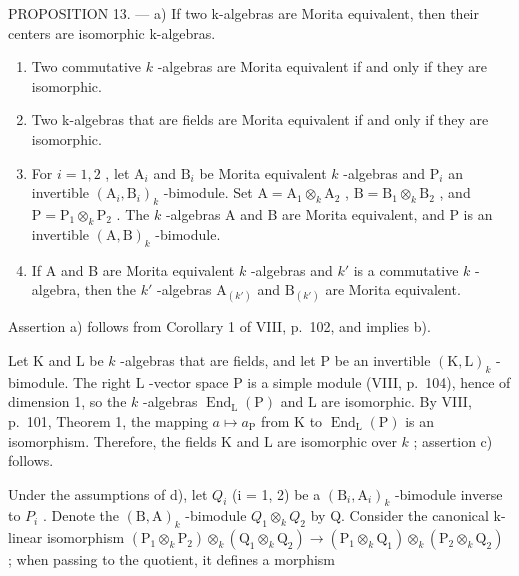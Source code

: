 PROPOSITION 13. --- a) If two k-algebras are Morita equivalent, then their centers are isomorphic k-algebras.

\begin{enumerate}
\def\labelenumi{\alph{enumi})}
\setcounter{enumi}{1}
\item
  Two commutative \(k\) -algebras are Morita equivalent if and only if they are isomorphic.
\item
  Two k-algebras that are fields are Morita equivalent if and only if they are isomorphic.
\item
  For \(i = 1,2\) , let \(\mathrm{A}_i\) and \(\mathrm{B}_i\) be Morita equivalent \(k\) -algebras and \(\mathrm{P}_i\) an invertible \((\mathrm{A}_i,\mathrm{B}_i)_k\) -bimodule. Set \(\mathrm{A} = \mathrm{A}_1\otimes_k\mathrm{A}_2\) , \(\mathrm{B} = \mathrm{B}_1\otimes_k\mathrm{B}_2\) , and \(\mathrm{P} = \mathrm{P}_1 \otimes_k \mathrm{P}_2\) . The \(k\) -algebras A and B are Morita equivalent, and P is an invertible \((\mathrm{A}, \mathrm{B})_k\) -bimodule.
\item
  If A and B are Morita equivalent \(k\) -algebras and \(k'\) is a commutative \(k\) -algebra, then the \(k'\) -algebras \(\mathrm{A}_{(k')}\) and \(\mathrm{B}_{(k')}\) are Morita equivalent.
\end{enumerate}

Assertion a) follows from Corollary 1 of VIII, p.~102, and implies b).

Let \(\mathrm{K}\) and \(\mathrm{L}\) be \(k\) -algebras that are fields, and let \(\mathrm{P}\) be an invertible \((\mathrm{K},\mathrm{L})_k\) -bimodule. The right \(\mathrm{L}\) -vector space \(\mathrm{P}\) is a simple module (VIII, p.~104), hence of dimension 1, so the \(k\) -algebras \(\operatorname{End}_{\mathrm{L}}(\mathrm{P})\) and \(\mathrm{L}\) are isomorphic. By VIII, p.~101, Theorem 1, the mapping \(a\mapsto a_{\mathrm{P}}\) from \(\mathrm{K}\) to \(\operatorname{End}_{\mathrm{L}}(\mathrm{P})\) is an isomorphism. Therefore, the fields \(\mathrm{K}\) and \(\mathrm{L}\) are isomorphic over \(k\) ; assertion c) follows.

Under the assumptions of d), let \(Q_{i}\) (i = 1, 2) be a \((\mathrm{B}_{i}, \mathrm{A}_{i})_{k}\) -bimodule inverse to \(P_{i}\) . Denote the \((\mathrm{B}, \mathrm{A})_{k}\) -bimodule \(Q_{1} \otimes_{k} Q_{2}\) by Q. Consider the canonical k-linear isomorphism \((\mathrm{P}_{1} \otimes_{k} \mathrm{P}_{2}) \otimes_{k} (\mathrm{Q}_{1} \otimes_{k} \mathrm{Q}_{2}) \to (\mathrm{P}_{1} \otimes_{k} \mathrm{Q}_{1}) \otimes_{k} (\mathrm{P}_{2} \otimes_{k} \mathrm{Q}_{2})\) ; when passing to the quotient, it defines a morphism

